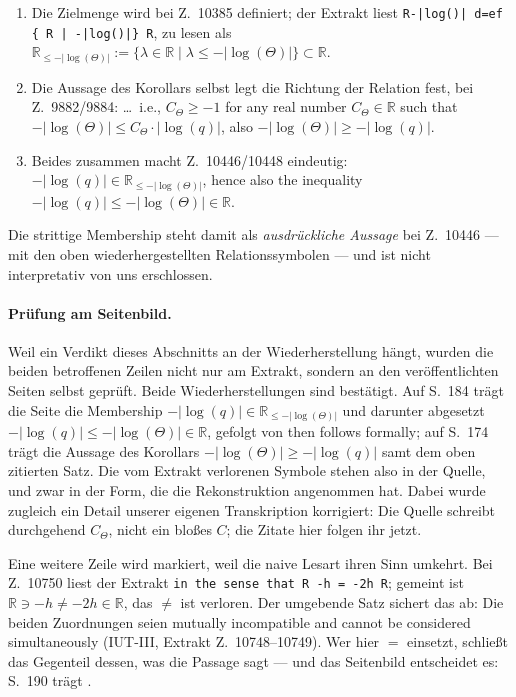 \documentclass[11pt,a4paper]{article}
\theoremstyle{definition}
\newcommand{\anchor}[2]{(#1, Extrakt Z.~#2)}
\begin{document}
\begin{enumerate}
\item Die Zielmenge wird bei Z.~10385 definiert; der Extrakt liest
  \texttt{R-|log()| d=ef \{ R | -|log()|\} R}, zu lesen als
  $\mathbb{R}_{\le -|\log(\Theta)|} := \{\lambda \in \mathbb{R} \mid
  \lambda \le -|\log(\Theta)|\} \subset \mathbb{R}$.
\item Die Aussage des Korollars selbst legt die Richtung der Relation fest, bei
  Z.~9882/9884: \glqq \dots\ i.e., $C_\Theta \ge -1$ for any real number
  $C_\Theta \in \mathbb{R}$ such that
  $-|\log(\Theta)| \le C_\Theta \cdot |\log(q)|$\grqq, also
  $-|\log(\Theta)| \ge -|\log(q)|$.
\item Beides zusammen macht Z.~10446/10448 eindeutig:
  $-|\log(q)| \in \mathbb{R}_{\le -|\log(\Theta)|}$, \glqq hence also the inequality\grqq
  $-|\log(q)| \le -|\log(\Theta)| \in \mathbb{R}$.
\end{enumerate}

Die strittige Membership steht damit als \emph{ausdrückliche Aussage} bei
Z.~10446 --- mit den oben wiederhergestellten Relationssymbolen --- und ist nicht
interpretativ von uns erschlossen.

\paragraph{Prüfung am Seitenbild.} Weil ein Verdikt dieses Abschnitts an der
Wiederherstellung hängt, wurden die beiden betroffenen Zeilen nicht nur am Extrakt,
sondern an den veröffentlichten Seiten selbst geprüft. Beide Wiederherstellungen
sind bestätigt. Auf S.~184 trägt die Seite die Membership
$-|\log(q)| \in \mathbb{R}_{\le -|\log(\Theta)|}$ und darunter abgesetzt
$-|\log(q)| \le -|\log(\Theta)| \in \mathbb{R}$, gefolgt von \glqq then follows
formally\grqq; auf S.~174 trägt die Aussage des Korollars
$-|\log(\Theta)| \ge -|\log(q)|$ samt dem oben zitierten Satz. Die vom Extrakt
verlorenen Symbole stehen also in der Quelle, und zwar in der Form, die die
Rekonstruktion angenommen hat. Dabei wurde zugleich ein Detail unserer eigenen
Transkription korrigiert: Die Quelle schreibt durchgehend $C_\Theta$, nicht ein
bloßes $C$; die Zitate hier folgen ihr jetzt.

Eine weitere Zeile wird markiert, weil die naive Lesart ihren Sinn umkehrt. Bei
Z.~10750 liest der Extrakt \texttt{in the sense that R -h = -2h R}; gemeint ist
$\mathbb{R} \ni -h \neq -2h \in \mathbb{R}$, das \glqq $\neq$\grqq{} ist verloren. Der
umgebende Satz sichert das ab: Die beiden Zuordnungen seien \glqq mutually
incompatible and cannot be considered simultaneously\grqq
\anchor{IUT-III}{10748--10749}. Wer hier \glqq $=$\grqq{} einsetzt, schließt das Gegenteil
dessen, was die Passage sagt --- und das Seitenbild entscheidet es: S.~190 trägt
\grqq.
\end{document}
